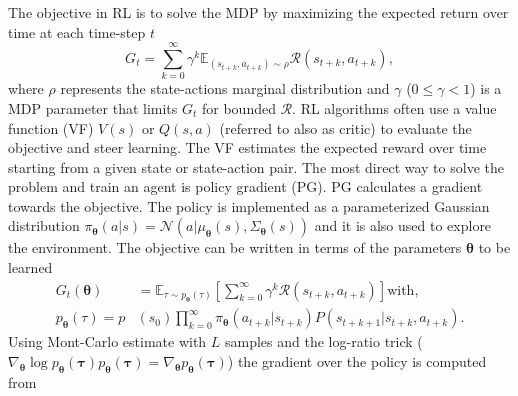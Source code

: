 \documentclass[letterpaper,conference,10pt]{IEEEconf}
\begin{document}
The objective in RL is to solve the MDP by maximizing the expected return over time at each time-step $t$
\begin{equation}
    \label{eq:rl}
    G_t=\sum\limits^\infty_{k=0}\gamma^k\mathbb{E}_{(s_{t+k}, a_{t+k})\sim\rho} \mathcal{R}(s_{t+k}, a_{t+k}),
\end{equation}
where $\rho$ represents the state-actions marginal distribution and $\gamma$ ($0\leq\gamma < 1$) is a MDP parameter that limits $G_t$ for bounded $\mathcal{R}$. RL algorithms often use a value function (VF) $V(s)$ or $Q(s,a)$ (referred to also as critic) to evaluate the objective and steer learning. The VF estimates the expected reward over time starting from a given state or state-action pair. The most direct way to solve the problem and train an agent is policy gradient (PG). PG calculates a gradient towards the objective. The policy is implemented as a parameterized Gaussian distribution $\pi_{\boldsymbol{\theta}}(a\vert s)=\mathcal{N}(a\vert \mu_{\boldsymbol{\theta}}(s), \Sigma_{\boldsymbol{\theta}}(s))$ and it is also used to explore the environment. The objective can be written in terms of the parameters $\boldsymbol{\theta}$ to be learned
\begin{align}
    \label{eq:policy_obj}
    G_t(\boldsymbol{\theta})&=\mathbb{E}_{\tau\sim p_{\boldsymbol{\theta}}(\tau)}\left[ \sum\limits^\infty_{k=0}\gamma^k \mathcal{R}(s_{t+k}, a_{t+k})\right] \text{with}, \\
    p_{\boldsymbol{\theta}}(\tau)=p&(s_0)\prod\limits^\infty_{k=0}\pi_{\boldsymbol{\theta}}(a_{t+k}\vert s_{t+k})P(s_{t+k+1}\vert s_{t+k},a_{t+k}). \nonumber
\end{align}
Using Mont-Carlo estimate with $L$ samples and the log-ratio trick ($\nabla_{\boldsymbol{\theta}}\log p_{\boldsymbol{\theta}}(\boldsymbol{\tau})p_{\boldsymbol{\theta}}(\boldsymbol{\tau})=\nabla_{\boldsymbol{\theta}} p_{\boldsymbol{\theta}}(\boldsymbol{\tau})$) the gradient over the policy is computed from 
\end{document}
